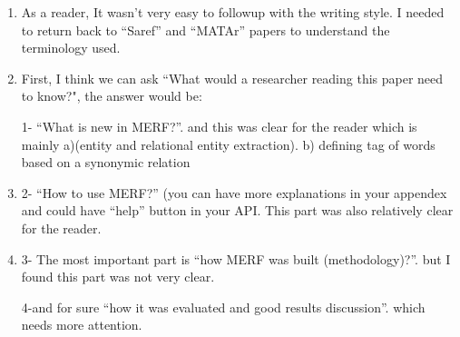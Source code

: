 \begin{enumerate}[leftmargin=0mm,label=\bfseries CommentR3.\arabic*]
\item \label{Review.3.1}
As a reader, It wasn't very easy to followup with the writing 
style. 
I needed to return back to ``Saref'' and ``MATAr'' papers 
to understand the terminology used.



\item \label{Review.3.2}
First, I think we can ask 
``What would a researcher reading this paper need to know?", the answer would be:

1- ``What is new in MERF?''. and this was clear for the reader 
    which is mainly
    a)(entity and relational entity extraction).
    b) defining tag of words based on a synonymic relation


\item \label{Review.3.3}
2- ``How to use MERF?''
(you can have more explanations in your appendex and could have 
``help'' button in your API. This part was also relatively 
clear for the reader.



\item \label{Review.3.4}
3- The most important part is ``how MERF was built 
(methodology)?''. but I found this part was not very clear.



4-and for sure ``how it was evaluated and good results discussion''. 
which needs more attention.



\end{enumerate}
